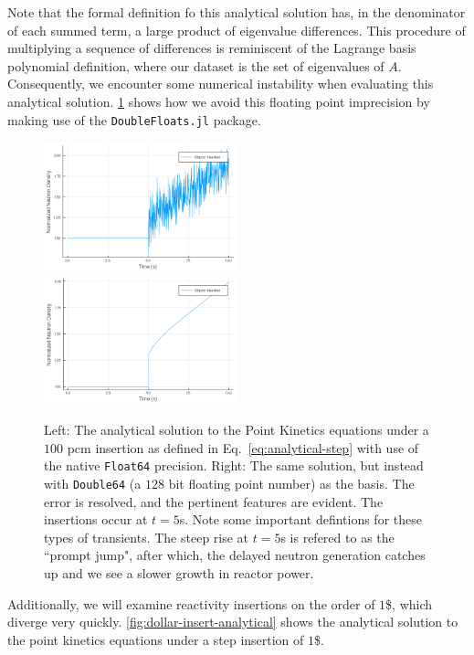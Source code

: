 \documentclass[review,onefignum,onetabnum]{siamart171218}
\begin{document}
Note that the formal definition fo this analytical solution has, in the denominator
of each summed term, a large product of eigenvalue differences. This procedure of
multiplying a sequence of differences is reminiscent of the Lagrange basis polynomial
definition, where our dataset is the set of eigenvalues of $A$. Consequently,
we encounter some numerical instability when evaluating this analytical solution.
\cref{fig:single-double-prec} shows how we avoid this floating point
imprecision by making use of the \texttt{DoubleFloats.jl} package.\\
\begin{figure}[htb]
  \includegraphics[width=0.5\textwidth]{../plots/analytical-sols/100pcm_fp_error.png}
  \includegraphics[width=0.5\textwidth]{../plots/analytical-sols/100pcm.png}
  \caption{Left: The analytical solution to the Point Kinetics equations under a $100$ pcm insertion
  as defined in Eq.~\cref{eq:analytical-step} with use of the native \texttt{Float64} precision.
  Right: The same solution, but instead with \texttt{Double64} (a $128$ bit floating point number)
  as the basis. The error is resolved, and the pertinent features are evident. The insertions occur
  at $t = 5$s. Note some important defintions for these types of transients. The steep rise
  at $t = 5$s is refered to as the ``prompt jump", after which, the delayed neutron generation
  catches up and we see a slower growth in reactor power.}
  \label{fig:single-double-prec}
\end{figure}

Additionally, we will examine reactivity insertions on the order of $1$\$, which
diverge very quickly. \cref{fig:dollar-insert-analytical} shows the analytical
solution to the point kinetics equations under a step insertion of $1$\$.\\
\end{document}
